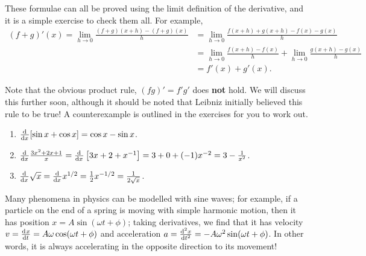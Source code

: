 These formulae can all be proved using the limit definition of the derivative, and it is a simple exercise to check them all. For example,
\begin{align*}
  (f + g)'(x) = \lim_{h \to 0} \frac{(f + g)(x + h) - (f + g)(x)}{h} &= \lim_{h \to 0} \frac{f(x + h) + g(x + h) - f(x) - g(x)}{h} \\
                                                                     &= \lim_{h \to 0} \frac{f(x + h) - f(x)}{h} + \lim_{h \to 0} \frac{g(x + h) - g(x)}{h} \\
                                                                     &= f'(x) + g'(x).
\end{align*}

Note that the obvious product rule, $ (fg)' = f'g' $ does \textbf{not} hold. We will discuss this further soon,
although it should be noted that Leibniz initially believed this rule to be true! A counterexample is outlined in the
exercises for you to work out.

\begin{exs}\leavevmode
  \begin{enumerate}
    \item $ \od{}{x} [\sin x + \cos x] = \cos x - \sin x $.
    \item $ \od{}{x} \frac{3x^2 + 2x + 1}{x} = \od{}{x} \left[ 3x + 2 + x^{-1} \right] = 3 + 0 + (-1)x^{-2} = 3 - \frac{1}{x^2} $.
    \item $ \od{}{x} \sqrt{x} = \od{}{x} x^{1/2} = \frac{1}{2}x^{-1/2} = \frac{1}{2\sqrt{x}} $.
  \end{enumerate}
\end{exs}

\begin{app}
  Many phenomena in physics can be modelled with sine waves; for example, if a particle on the end of a spring
  is moving with simple harmonic motion, then it has position $ x = A \sin (\omega t + \phi) $; taking derivatives,
  we find that it has velocity $ v = \od{x}{t} = A\omega \cos (\omega t + \phi) $ and acceleration $ a = \od[2]{x}{t} = -A \omega^2 \sin (\omega t + \phi) $.
  In other words, it is always accelerating in the opposite direction to its movement!
\end{app}

\clearpage
